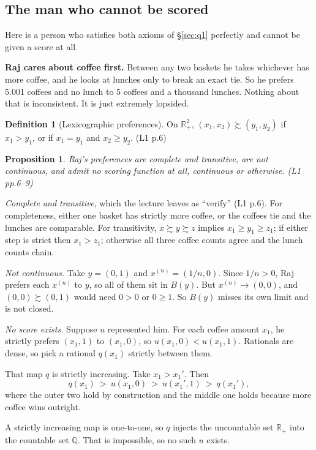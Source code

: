 \documentclass[11pt,letterpaper]{article}
\theoremstyle{definition}
\newtheorem{defn}{Definition}
\theoremstyle{plain}
\newtheorem{prop}{Proposition}
\newcommand{\src}[1]{{\small\textsf{(#1)}}}
\newcommand{\wpref}{\succsim}
\newcommand{\skipnote}{\noindent{\small\textsf{Proof. Skippable on a first read.}}\par\smallskip}
\begin{document}
\subsection{The man who cannot be scored}

Here is a person who satisfies both axioms of \S\ref{sec:q1} perfectly and cannot be given a score
at all.

\textbf{Raj cares about coffee first.} Between any two baskets he takes whichever has more coffee,
and he looks at lunches only to break an exact tie. So he prefers 5.001 coffees and no lunch to 5
coffees and a thousand lunches. Nothing about that is inconsistent. It is just extremely lopsided.

\begin{defn}[Lexicographic preferences] On $\mathbb{R}^2_+$,
$(x_1,x_2) \wpref (y_1,y_2)$ if $x_1 > y_1$, or if $x_1 = y_1$ and $x_2 \ge y_2$. \src{L1 p.6}
\end{defn}

\begin{prop} Raj's preferences are complete and transitive, are not continuous, and admit no scoring
function at all, continuous or otherwise. \src{L1 pp.6--9}
\end{prop}

\skipnote
\begin{leftbar}
\small
\emph{Complete and transitive}, which the lecture leaves as ``verify'' \src{L1 p.6}. For
completeness, either one basket has strictly more coffee, or the coffees tie and the lunches are
comparable. For transitivity, $x \wpref y \wpref z$ implies $x_1 \ge y_1 \ge z_1$; if either step is
strict then $x_1 > z_1$; otherwise all three coffee counts agree and the lunch counts chain.

\emph{Not continuous.} Take $y = (0,1)$ and $x^{(n)} = (1/n, 0)$. Since $1/n > 0$, Raj prefers each
$x^{(n)}$ to $y$, so all of them sit in $B(y)$. But $x^{(n)} \to (0,0)$, and $(0,0) \wpref (0,1)$
would need $0 > 0$ or $0 \ge 1$. So $B(y)$ misses its own limit and is not closed.

\emph{No score exists.} Suppose $u$ represented him. For each coffee amount $x_1$, he strictly
prefers $(x_1,1)$ to $(x_1,0)$, so $u(x_1,0) < u(x_1,1)$. Rationals are dense, so pick a rational
$q(x_1)$ strictly between them.

That map $q$ is strictly increasing. Take $x_1 > x_1'$. Then
\[
q(x_1) \ > \ u(x_1,0) \ > \ u(x_1',1) \ > \ q(x_1'),
\]
where the outer two hold by construction and the middle one holds because more coffee wins outright.

A strictly increasing map is one-to-one, so $q$ injects the uncountable set $\mathbb{R}_+$ into the
countable set $\mathbb{Q}$. That is impossible, so no such $u$ exists.
\end{leftbar}
\end{document}
